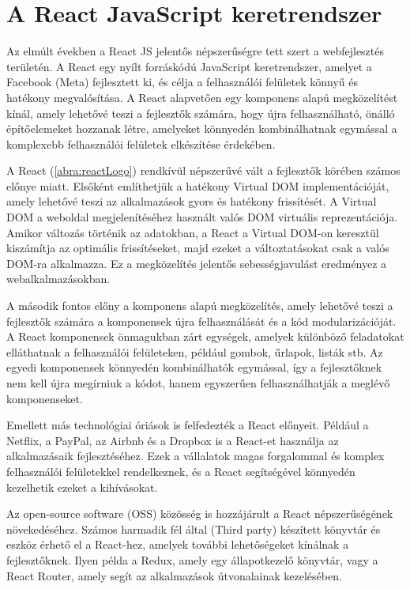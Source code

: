 \section {A React JavaScript keretrendszer}

Az elmúlt években a React JS jelentős népszerűségre tett szert a webfejlesztés területén. A React egy nyílt forráskódú JavaScript keretrendszer, amelyet a Facebook (Meta) fejlesztett ki, és célja a felhasználói felületek könnyű és hatékony megvalósítása. A React alapvetően egy komponens alapú megközelítést kínál, amely lehetővé teszi a fejlesztők számára, hogy újra felhasználható, önálló építőelemeket hozzanak létre, amelyeket könnyedén kombinálhatnak egymással a komplexebb felhasználói felületek elkészítése érdekében.

A React (\ref{abra:reactLogo}) rendkívül népszerűvé vált a fejlesztők körében számos előnye miatt. Elsőként említhetjük a hatékony Virtual DOM implementációját, amely lehetővé teszi az alkalmazások gyors és hatékony frissítését. A Virtual DOM a weboldal megjelenítéséhez használt valós DOM virtuális reprezentációja. Amikor változás történik az adatokban, a React a Virtual DOM-on keresztül kiszámítja az optimális frissítéseket, majd ezeket a változtatásokat csak a valós DOM-ra alkalmazza. Ez a megközelítés jelentős sebességjavulást eredményez a webalkalmazásokban.

A második fontos előny a komponens alapú megközelítés, amely lehetővé teszi a fejlesztők számára a komponensek újra felhasználását és a kód modularizációját. A React komponensek önmagukban zárt egységek, amelyek különböző feladatokat elláthatnak a felhasználói felületeken, például gombok, űrlapok, listák stb. Az egyedi komponensek könnyedén kombinálhatók egymással, így a fejlesztőknek nem kell újra megírniuk a kódot, hanem egyszerűen felhasználhatják a meglévő komponenseket.

Emellett más technológiai óriások is felfedezték a React előnyeit. Például a Netflix, a PayPal, az Airbnb és a Dropbox is a React-et használja az alkalmazásaik fejlesztéséhez. Ezek a vállalatok magas forgalommal és komplex felhasználói felületekkel rendelkeznek, és a React segítségével könnyedén kezelhetik ezeket a kihívásokat.

Az open-source software (OSS) közösség is hozzájárult a React népszerűségének növekedéséhez. Számos harmadik fél által (Third party) készített könyvtár és eszköz érhető el a React-hez, amelyek további lehetőségeket kínálnak a fejlesztőknek. Ilyen példa a Redux, amely egy állapotkezelő könyvtár, vagy a React Router, amely segít az alkalmazások útvonalainak kezelésében.

